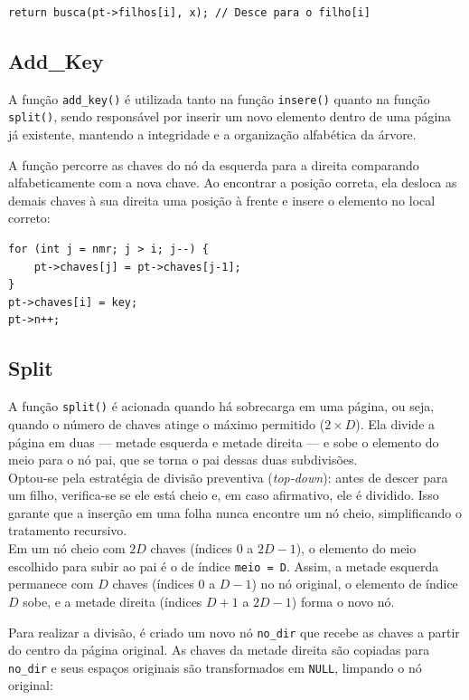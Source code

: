 \documentclass[12pt,a4paper]{article}
\begin{document}
\begin{lstlisting}
return busca(pt->filhos[i], x); // Desce para o filho[i]
\end{lstlisting}

\subsection{Add\_Key}

A função \texttt{add\_key()} é utilizada tanto na função \texttt{insere()} quanto na função \texttt{split()}, sendo responsável por inserir um novo elemento dentro de uma página já existente, mantendo a integridade e a organização alfabética da árvore.

A função percorre as chaves do nó da esquerda para a direita comparando alfabeticamente com a nova chave. Ao encontrar a posição correta, ela desloca as demais chaves à sua direita uma posição à frente e insere o elemento no local correto:

\begin{lstlisting}
for (int j = nmr; j > i; j--) {
    pt->chaves[j] = pt->chaves[j-1];
}
pt->chaves[i] = key;
pt->n++;
\end{lstlisting}

\subsection{Split}

A função \texttt{split()} é acionada quando há sobrecarga em uma página, ou seja, quando o número de chaves atinge o máximo permitido ($2 \times D$). Ela divide a página em duas — metade esquerda e metade direita — e sobe o elemento do meio para o nó pai, que se torna o pai dessas duas subdivisões.\\

Optou-se pela estratégia de divisão preventiva (\textit{top-down}): antes de
descer para um filho, verifica-se se ele está cheio e, em caso afirmativo,
ele é dividido. Isso garante que a inserção em uma folha nunca encontre um
nó cheio, simplificando o tratamento recursivo.\\

Em um nó cheio com $2D$ chaves (índices $0$ a $2D-1$), o elemento do meio
escolhido para subir ao pai é o de índice \texttt{meio = D}. Assim, a metade
esquerda permanece com $D$ chaves (índices $0$ a $D-1$) no nó original, o
elemento de índice $D$ sobe, e a metade direita (índices $D+1$ a $2D-1$)
forma o novo nó.

Para realizar a divisão, é criado um novo nó \texttt{no\_dir} que recebe as chaves a partir do centro da página original. As chaves da metade direita são copiadas para \texttt{no\_dir} e seus espaços originais são transformados em \texttt{NULL}, limpando o nó original:
\end{document}
